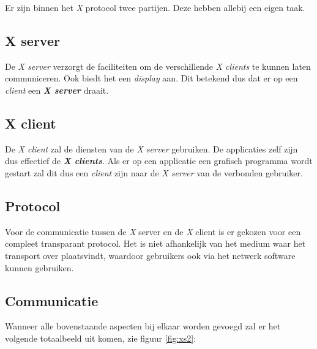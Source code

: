 Er zijn binnen het \emph{X} protocol twee partijen. Deze hebben allebij een eigen taak. 

\subsection{X server}
De \emph{X server} verzorgt de faciliteiten om de verschillende \emph{X clients} te kunnen laten communiceren. Ook biedt het een \emph{display} aan. Dit betekend dus dat er op een \emph{client} een \textbf{\emph{X server}} draait. 

\subsection{X client}
De \emph{X client} zal de diensten van de \emph{X server} gebruiken. De applicaties zelf zijn dus effectief de \textbf{\emph{X clients}}. Als er op een applicatie een grafisch programma wordt gestart zal dit dus een \emph{client} zijn naar de \emph{X server} van de verbonden gebruiker. 

\subsection{Protocol}
Voor de communicatie tussen de \emph{X} server en de \emph{X} client is er gekozen voor een compleet transparant protocol. Het is niet afhankelijk van het medium waar het transport over plaatsvindt, waardoor gebruikers ook via het netwerk software kunnen gebruiken. 

\subsection{Communicatie}
Wanneer alle bovenstaande aspecten bij elkaar worden gevoegd zal er het volgende totaalbeeld uit komen, zie figuur \ref{fig:xs2}:


